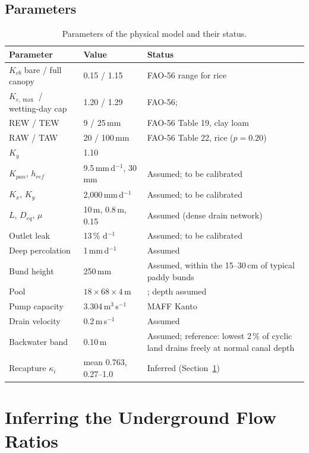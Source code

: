 \documentclass[11pt]{article}
\begin{document}
\subsection{Parameters}
\begin{table}[H]
\centering\small
\begin{tabular}{L{4.6cm}L{3.0cm}L{7.6cm}}
\toprule
\textbf{Parameter} & \textbf{Value} & \textbf{Status} \\ \midrule
$K_{cb}$ bare / full canopy & 0.15 / 1.15 & FAO-56 range for rice \citep{Allen1998FAO56} \\
$K_{c,\max}$ / wetting-day cap & 1.20 / 1.29 & FAO-56; \citet{Xu2017DualKc} \\
REW / TEW & 9 / 25\,mm & FAO-56 Table 19, clay loam \\
RAW / TAW & 20 / 100\,mm & FAO-56 Table 22, rice ($p = 0.20$) \\
$K_y$ & 1.10 & \citet{Doorenbos1979} \\
$K_{pan}$, $h_{ref}$ & 9.5\,mm\,d$^{-1}$, 30\,mm & Assumed; to be calibrated \\
$K_x$, $K_y$ & 2,000\,mm\,d$^{-1}$ & Assumed; to be calibrated \\
$L$, $D_{eq}$, $\mu$ & 10\,m, 0.8\,m, 0.15 & Assumed (dense drain network) \\
Outlet leak & 13\,\% d$^{-1}$ & Assumed; to be calibrated \\
Deep percolation & 1\,mm\,d$^{-1}$ & Assumed \\
Bund height & 250\,mm & Assumed, within the 15--30\,cm of typical paddy bunds \\
Pool & $18\times68\times4$\,m & \citet{Okura2025WaterBalance}; depth assumed \\
Pump capacity & 3.304\,m$^3$\,s$^{-1}$ & MAFF Kanto \\
Drain velocity & 0.2\,m\,s$^{-1}$ & Assumed \\
Backwater band & 0.10\,m & Assumed; reference: lowest 2\,\% of cyclic land drains freely at normal canal depth \\
Recapture $\kappa_i$ & mean 0.763, 0.27--1.0 & Inferred (Section~\ref{sec:identification}) \\
\bottomrule
\end{tabular}
\caption{Parameters of the physical model and their status.}
\label{tab:params}
\end{table}

\section{Inferring the Underground Flow Ratios}
\label{sec:identification}
\end{document}
